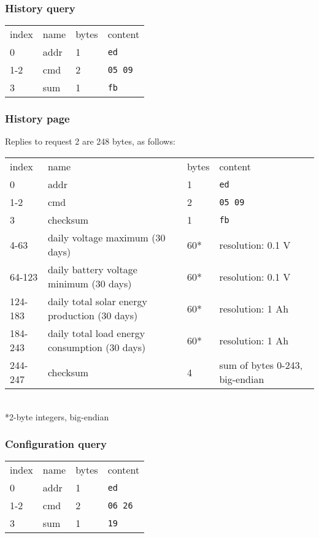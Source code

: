 \documentclass[pdftex,oneside,12pt,a4paper]{book}
\begin{document}
\subsubsection{History query}
\noindent
\begin{tabular}{llll}
index & name & bytes & content\\
0 & addr & 1 & \verb|ed|\\
1-2 & cmd & 2 & \verb|05 09|\\
3 & sum & 1 & \verb|fb|
\end{tabular}

\subsubsection{History page}
Replies to request 2 are 248 bytes, as follows:\\
\begin{tabular}{llll}
index & name & bytes & content\\
0 & addr & 1 & \verb|ed|\\
1-2 & cmd & 2 & \verb|05 09|\\
3 & checksum & 1 & \verb|fb|\\
4-63 & daily voltage maximum (30 days) & 60* & resolution: 0.1 V\\
64-123 & daily battery voltage minimum (30 days) & 60* & resolution: 0.1 V\\
124-183 & daily total solar energy production (30 days) & 60* & resolution: 1 Ah\\
184-243 & daily total load energy consumption (30 days) & 60* & resolution: 1 Ah\\
244-247 & checksum & 4 & sum of bytes 0-243, big-endian
\end{tabular}\\
{*}2-byte integers, big-endian

\subsubsection{Configuration query}
\noindent
\begin{tabular}{llll}
index & name & bytes & content\\
0 & addr & 1 & \verb|ed|\\
1-2 & cmd & 2 & \verb|06 26|\\
3 & sum & 1 & \verb|19|
\end{tabular}
\end{document}
